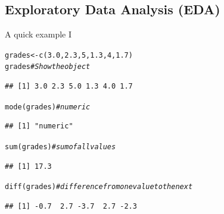 \documentclass[xcolor=table,       handout,    xcolor=dvipsnames]{beamer}\usepackage[]{graphicx}\usepackage[]{color}
\makeatletter
\newcommand{\hlnum}[1]{\textcolor[rgb]{0,0,0}{#1}}
\newcommand{\hlcom}[1]{\textcolor[rgb]{0,0.392,0}{\textit{#1}}}
\newcommand{\hlstd}[1]{\textcolor[rgb]{0,0,0}{#1}}
\newcommand{\hlkwb}[1]{\textcolor[rgb]{0,0,0}{#1}}
\newcommand{\hlkwd}[1]{\textcolor[rgb]{0,0,1}{#1}}
\newenvironment{kframe}{%
 \def\at@end@of@kframe{}%
 \ifinner\ifhmode%
  \def\at@end@of@kframe{\end{minipage}}%
  \begin{minipage}{\columnwidth}%
 \fi\fi%
 \def\FrameCommand##1{\hskip\@totalleftmargin \hskip-\fboxsep
 \colorbox{shadecolor}{##1}\hskip-\fboxsep
     \hskip-\linewidth \hskip-\@totalleftmargin \hskip\columnwidth}%
 \MakeFramed {\advance\hsize-\width
   \@totalleftmargin\z@ \linewidth\hsize
   \@setminipage}}%
 {\par\unskip\endMakeFramed%
 \at@end@of@kframe}
\newenvironment{knitrout}{}{} %
\makeatother
\begin{document}
\subsection{Exploratory Data Analysis (EDA)}

\begin{frame}[fragile]{A quick example I}
\begin{knitrout}
\color{fgcolor}\begin{kframe}
\begin{alltt}
\hlstd{grades} \hlkwb{<-} \hlkwd{c}\hlstd{(}\hlnum{3.0}\hlstd{,} \hlnum{2.3}\hlstd{,} \hlnum{5}\hlstd{,} \hlnum{1.3}\hlstd{,} \hlnum{4}\hlstd{,} \hlnum{1.7}\hlstd{)}
\hlstd{grades}         \hlcom{# Show the object}
\end{alltt}
\begin{verbatim}
## [1] 3.0 2.3 5.0 1.3 4.0 1.7
\end{verbatim}
\begin{alltt}
\hlkwd{mode}\hlstd{(grades)}   \hlcom{# numeric}
\end{alltt}
\begin{verbatim}
## [1] "numeric"
\end{verbatim}
\begin{alltt}
\hlkwd{sum}\hlstd{(grades)}    \hlcom{# sum of all values}
\end{alltt}
\begin{verbatim}
## [1] 17.3
\end{verbatim}
\begin{alltt}
\hlkwd{diff}\hlstd{(grades)}   \hlcom{# difference from one value to the next}
\end{alltt}
\begin{verbatim}
## [1] -0.7  2.7 -3.7  2.7 -2.3
\end{verbatim}
\end{kframe}
\end{knitrout}
\end{frame}

\end{document}
